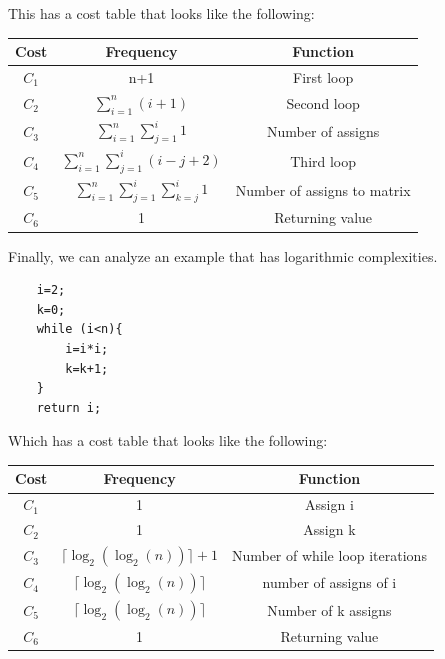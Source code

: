 \documentclass[nobib]{tufte-handout}
\begin{document}
This has a cost table that looks like the following:
\begin{table}
    \centering
    \begin{tabular}{c|c|c}
        Cost  & Frequency                                        & Function                    \\
        \hline
        $C_1$ & n+1                                              & First loop                  \\
        $C_2$ & $\sum_{i=1}^{n} (i+1)$                           & Second loop                 \\
        $C_3$ & $\sum_{i=1}^{n} \sum_{j=1}^{i} 1 $               & Number of assigns           \\
        $C_4$ & $\sum_{i=1}^{n} \sum_{j=1}^{i} (i-j+2) $         & Third loop                  \\
        $C_5$ & $\sum_{i=1}^{n} \sum_{j=1}^{i} \sum_{k=j}^{i} 1$ & Number of assigns to matrix \\
        $C_6$ & 1                                                & Returning value             \\
    \end{tabular}
\end{table}
Finally, we can analyze an example that has logarithmic complexities.
\begin{lstlisting}
    i=2;
    k=0;
    while (i<n){
        i=i*i;
        k=k+1;
    }
    return i;
\end{lstlisting}
Which has a cost table that looks like the following:\\
\begin{table}
    \centering
    \begin{tabular}{c|c|c}
        Cost  & Frequency                          & Function                        \\
        \hline
        $C_1$ & 1                                  & Assign i                        \\
        $C_2$ & 1                                  & Assign k                        \\
        $C_3$ & $\lceil \log_2(\log_2(n))\rceil+1$ & Number of while loop iterations \\
        $C_4$ & $\lceil \log_2(\log_2(n))\rceil $  & number of assigns of i          \\
        $C_5$ & $\lceil \log_2(\log_2(n))\rceil$   & Number of k assigns             \\
        $C_6$ & 1                                  & Returning value                 \\
    \end{tabular}
\end{table}
\end{document}
